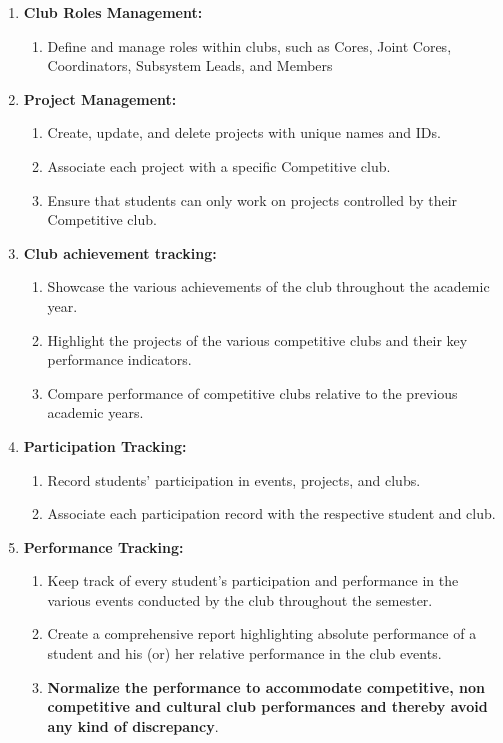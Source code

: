 \begin{enumerate}
    \item \textbf{Club Roles Management: }
    \begin{enumerate}
        \item Define and manage roles within clubs, such as Cores, Joint Cores, Coordinators, Subsystem Leads, and Members
    \end{enumerate}

    \item \textbf{Project Management: }
    \begin{enumerate}
        \item Create, update, and delete projects with unique names and IDs.
        \item Associate each project with a specific Competitive club.
        \item Ensure that students can only work on projects controlled by their Competitive club.

    \end{enumerate}

        \item \textbf{Club achievement tracking: }
    \begin{enumerate}
        \item Showcase the various achievements of the club throughout the academic year.
        \item Highlight the projects of the various competitive clubs and their key performance indicators.
        \item  Compare performance of competitive clubs relative to the previous academic years.
    \end{enumerate}    

    \item \textbf{Participation Tracking: }
    \begin{enumerate}
        \item Record students' participation in events, projects, and clubs.
        \item Associate each participation record with the respective student and club.
    \end{enumerate}

    \item \textbf{Performance Tracking: }
    \begin{enumerate}
        \item Keep track of every student's participation and performance in the various events conducted by the club throughout the semester.
        \item Create a comprehensive report highlighting absolute performance of a student and his (or) her relative performance in the club events.
        \item \textbf{Normalize the performance to accommodate competitive, non competitive and cultural club performances and thereby avoid any kind of discrepancy}.
            

\end{enumerate}
\end{enumerate}
